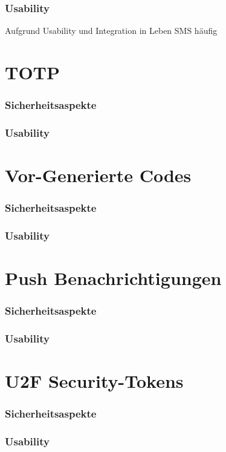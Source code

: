\subsubsection{Usability}
Aufgrund Usability und Integration in Leben SMS häufig \parencite{peetersSMSOTP2022}

\section{TOTP}
\label{sec:totp}
\subsubsection{Sicherheitsaspekte}
\subsubsection{Usability}
\section{Vor-Generierte Codes}
\subsubsection{Sicherheitsaspekte}
\parencite[geht auf bingo cards ein]{abhishekComprehensiveStudy2013}
\subsubsection{Usability}
\section{Push Benachrichtigungen}
\subsubsection{Sicherheitsaspekte}
\subsubsection{Usability}
\section{U2F Security-Tokens}
\subsubsection{Sicherheitsaspekte}
\subsubsection{Usability}
